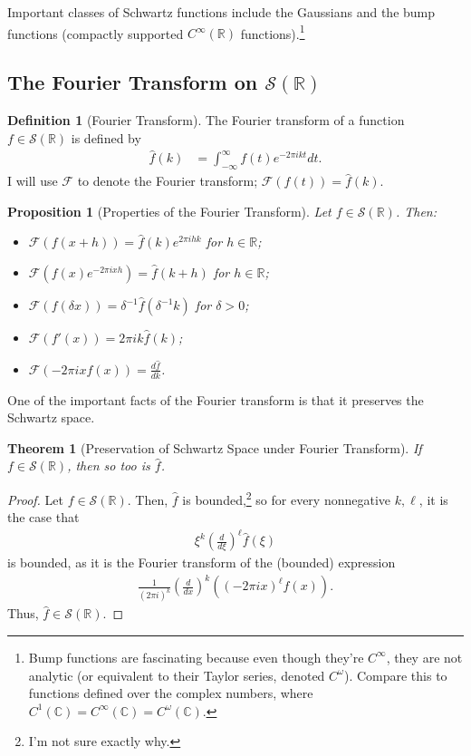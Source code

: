 \documentclass[10pt]{extarticle}
\newcommand{\R}{\mathbb{R}}
\newcommand{\C}{\mathbb{C}}
\theoremstyle{plain}
\newtheorem*{theorem}{Theorem}%
\newtheorem*{proposition}{Proposition}%
\theoremstyle{definition}
\newtheorem*{definition}{Definition}
\theoremstyle{remark}
\begin{document}
  Important classes of Schwartz functions include the Gaussians and the bump functions (compactly supported $C^{\infty}(\R)$ functions).\footnote{Bump functions are fascinating because even though they're $C^{\infty}$, they are not analytic (or equivalent to their Taylor series, denoted $C^{\omega}$). Compare this to functions defined over the complex numbers, where $C^{1}(\C) = C^{\infty}(\C) = C^{\omega}(\C)$.}
  \subsection{The Fourier Transform on $\mathcal{S}(\R)$}%
  \begin{definition}[Fourier Transform]
    The Fourier transform of a function $f\in \mathcal{S}(\R)$ is defined by
    \begin{align*}
      \hat{f}(k) &= \int_{-\infty}^{\infty}f(t)e^{-2\pi i k t}dt.
    \end{align*}
    I will use $\mathcal{F}$ to denote the Fourier transform; $\mathcal{F}(f(t)) = \hat{f}(k)$. 
  \end{definition}
  \begin{proposition}[Properties of the Fourier Transform]
    Let $f\in \mathcal{S}(\R)$. Then:
    \begin{itemize}
      \item $\displaystyle\mathcal{F}(f(x+h)) = \hat{f}(k)e^{2\pi i h k}$ for $h\in \R$;
      \item $\displaystyle \mathcal{F}\left(f(x)e^{-2\pi i x h}\right) = \hat{f}(k + h)$ for $h\in \R$;
      \item $\displaystyle \mathcal{F}\left(f(\delta x)\right) = \delta^{-1}\hat{f}(\delta^{-1}k)$ for $\delta > 0$;
      \item $\mathcal{F}(f'(x)) = 2\pi i k \hat{f}(k)$;
      \item $\mathcal{F}(-2\pi i x f(x)) = \frac{d\hat{f}}{dk}$.
    \end{itemize}
  \end{proposition}
  One of the important facts of the Fourier transform is that it preserves the Schwartz space.
  \begin{theorem}[Preservation of Schwartz Space under Fourier Transform]
    If $f\in \mathcal{S}(\R)$, then so too is $\hat{f}$.
  \end{theorem}
  \begin{proof}
    Let $f\in \mathcal{S}(\R)$. Then, $\hat{f}$ is bounded,\footnote{I'm not sure exactly why.} so for every nonnegative $k,\ell$, it is the case that
    \begin{align*}
      \xi^{k}\left(\frac{d}{d\xi}\right)^{\ell}\hat{f}(\xi)
    \end{align*}
    is bounded, as it is the Fourier transform of the (bounded) expression
    \begin{align*}
      \frac{1}{(2\pi i)^k}\left(\frac{d}{dx}\right)^k \left((-2\pi i x)^{\ell}f(x)\right).
    \end{align*}
    Thus, $\hat{f}\in \mathcal{S}(\R)$.
  \end{proof}
\end{document}
